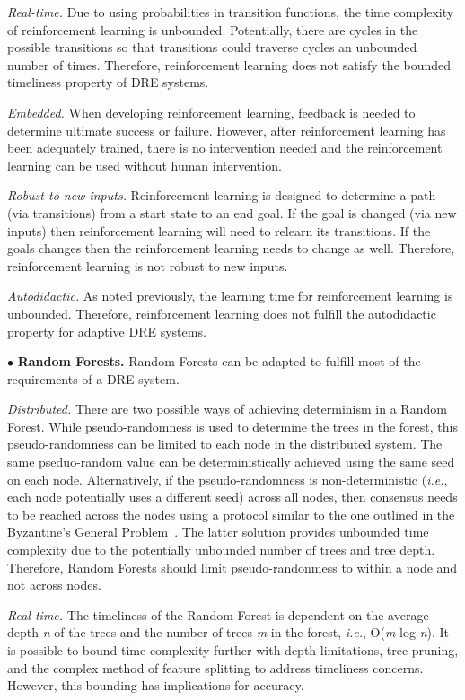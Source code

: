 \documentclass[conference]{IEEEtran}
\begin{document}
\emph{Real-time.} Due to using probabilities in transition functions, the time complexity of reinforcement learning is unbounded. Potentially, there are cycles in the possible transitions so that transitions could traverse cycles an unbounded number of times. Therefore, reinforcement learning does not satisfy the bounded timeliness property of DRE systems.

\emph{Embedded.} When developing reinforcement learning, feedback is needed to determine ultimate success or failure. However, after reinforcement learning has been adequately trained, there is no intervention needed and the reinforcement learning can be used without human intervention.

\emph{Robust to new inputs.} Reinforcement learning is designed to determine a path (via transitions) from a start state to an end goal. If the goal is changed (via new inputs) then reinforcement learning will need to relearn its transitions. If the goals changes then the reinforcement learning needs to change as well. Therefore, reinforcement learning is not robust to new inputs.

\emph{Autodidactic.} As noted previously, the learning time for reinforcement learning is unbounded. Therefore, reinforcement learning does not fulfill the autodidactic property for adaptive DRE systems.


$\bullet$ {\bf Random Forests.}
Random Forests can be adapted to fulfill most of the requirements of a DRE system.

\emph{Distributed.} There are two possible ways of achieving determinism in a Random Forest. While pseudo-randomness is used to determine the trees in the forest, this pseudo-randomness can be limited to each node in the distributed system. The same pseduo-random value can be deterministically achieved using the same seed on each node. Alternatively, if the pseudo-randomness is non-deterministic (\emph{i.e.}, each node potentially uses a different seed) across all nodes, then consensus needs to be reached across the nodes using a protocol similar to the one outlined in the Byzantine's General Problem~\cite{Lamport:82}. The latter solution provides unbounded time complexity due to the potentially unbounded number of trees and tree depth. Therefore, Random Forests should limit pseudo-randonmess to within a node and not across nodes.

\emph{Real-time.} The timeliness of the Random Forest is dependent on the average depth \emph{n} of the trees and the number of trees \emph{m} in the forest, \emph{i.e.}, O(\emph{m} log \emph{n})\cite{Lin:06}. It is possible to bound time complexity further with depth limitations, tree pruning, and the complex method of feature splitting\cite{Ho:95} to address timeliness concerns. However, this bounding has implications for accuracy.
\end{document}
